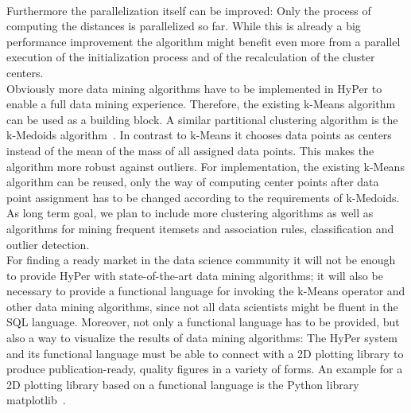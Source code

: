 \\
Furthermore the parallelization itself can be improved: Only the process of computing the distances is parallelized so far. While this is already a big performance improvement the algorithm might benefit even more from a parallel execution of the initialization process and of the recalculation of the cluster centers.
\\
Obviously more data mining algorithms have to be implemented in HyPer to enable a full data mining experience. Therefore, the existing k-Means algorithm can be used as a building block. A similar partitional clustering algorithm is the k-Medoids algorithm~\parencite{medoid}. In contrast to k-Means it chooses data points as centers instead of the mean of the mass of all assigned data points. This makes the algorithm more robust against outliers. For implementation, the existing k-Means algorithm can be reused, only the way of computing center points after data point assignment has to be changed according to the requirements of k-Medoids. As long term goal, we plan to include more clustering algorithms as well as algorithms for mining frequent itemsets and association rules, classification and outlier detection.
\\
For finding a ready market in the data science community it will not be enough to provide HyPer with state-of-the-art data mining algorithms; it will also be necessary to provide a functional language for invoking the k-Means operator and other data mining algorithms, since not all data scientists might be fluent in the SQL language. Moreover, not only a functional language has to be provided, but also a way to visualize the results of data mining algorithms: The HyPer system and its functional language must be able to connect with a 2D plotting library to produce publication-ready, quality figures in a variety of forms. An example for a 2D plotting library based on a functional language is the Python library matplotlib~\parencite{Hunter:2007}. 





